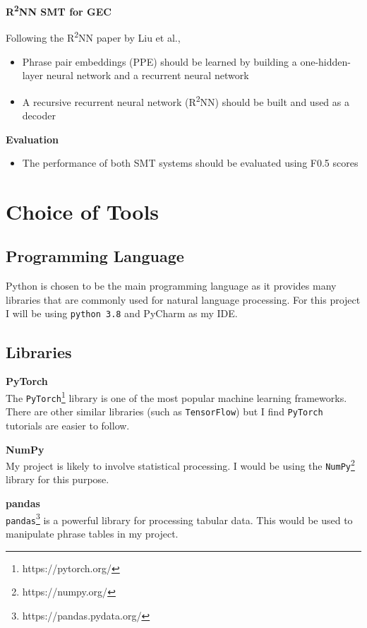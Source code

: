 \documentclass[12pt,a4paper,twoside,openright]{report}
\begin{document}
\textbf{R\textsuperscript{2}NN SMT for GEC}

Following the R\textsuperscript{2}NN paper by Liu et al.\cite{r2nn},
\begin{itemize}
    \item Phrase pair embeddings (PPE) should be learned by building a one-hidden-layer neural network and a recurrent neural network
    \item A recursive recurrent neural network (R\textsuperscript{2}NN) should be built and used as a decoder
\end{itemize}

\textbf{Evaluation}
\begin{itemize}
    \item The performance of both SMT systems should be evaluated using F0.5 scores
\end{itemize}

\section{Choice of Tools}

\subsection{Programming Language}

Python is chosen to be the main programming language as it provides many libraries that are commonly used for natural language processing. For this project I will be using \texttt{python 3.8} and PyCharm as my IDE.

\subsection{Libraries}
\textbf{PyTorch} \\
The \texttt{PyTorch}\footnote{https://pytorch.org/} library is one of the most popular machine learning frameworks. There are other similar libraries (such as \texttt{TensorFlow}) but I find \texttt{PyTorch} tutorials are easier to follow.

\textbf{NumPy} \\
My project is likely to involve statistical processing. I would be using the \texttt{NumPy}\footnote{https://numpy.org/} library for this purpose.

\textbf{pandas} \\
\texttt{pandas}\footnote{https://pandas.pydata.org/} is a powerful library for processing tabular data. This would be used to manipulate phrase tables in my project.
\end{document}
